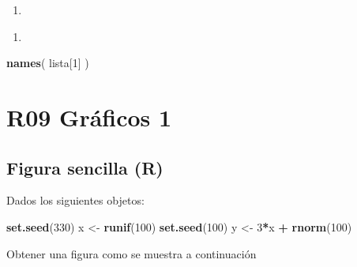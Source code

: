 \documentclass[]{book}
\newenvironment{Shaded}{\begin{snugshade}}{\end{snugshade}}
\newcommand{\DecValTok}[1]{\textcolor[rgb]{0.00,0.00,0.81}{#1}}
\newcommand{\KeywordTok}[1]{\textcolor[rgb]{0.13,0.29,0.53}{\textbf{#1}}}
\newcommand{\NormalTok}[1]{#1}
\newcommand{\OperatorTok}[1]{\textcolor[rgb]{0.81,0.36,0.00}{\textbf{#1}}}
\newcommand{\StringTok}[1]{\textcolor[rgb]{0.31,0.60,0.02}{#1}}
\begin{document}
\begin{enumerate}
\def\labelenumi{\arabic{enumi}.}
\setcounter{enumi}{7}
\item
\end{enumerate}

\begin{Shaded}
\end{Shaded}

\begin{enumerate}
\def\labelenumi{\arabic{enumi}.}
\setcounter{enumi}{8}
\item
\end{enumerate}

\begin{Shaded}
\begin{Highlighting}[]
\KeywordTok{names}\NormalTok{( lista[}\DecValTok{1}\NormalTok{] )}
\end{Highlighting}
\end{Shaded}

\hypertarget{r09-gruxe1ficos-1}{%
\chapter*{R09 Gráficos 1}\label{r09-gruxe1ficos-1}}

\hypertarget{figura-sencilla-r}{%
\section{Figura sencilla (R)}\label{figura-sencilla-r}}

Dados los siguientes objetos:

\begin{Shaded}
\begin{Highlighting}[]
\KeywordTok{set.seed}\NormalTok{(}\DecValTok{330}\NormalTok{)}
\NormalTok{x <-}\StringTok{ }\KeywordTok{runif}\NormalTok{(}\DecValTok{100}\NormalTok{)}
\KeywordTok{set.seed}\NormalTok{(}\DecValTok{100}\NormalTok{)}
\NormalTok{y <-}\StringTok{ }\DecValTok{3}\OperatorTok{*}\NormalTok{x }\OperatorTok{+}\StringTok{ }\KeywordTok{rnorm}\NormalTok{(}\DecValTok{100}\NormalTok{)}
\end{Highlighting}
\end{Shaded}

Obtener una figura como se muestra a continuación
\end{document}
